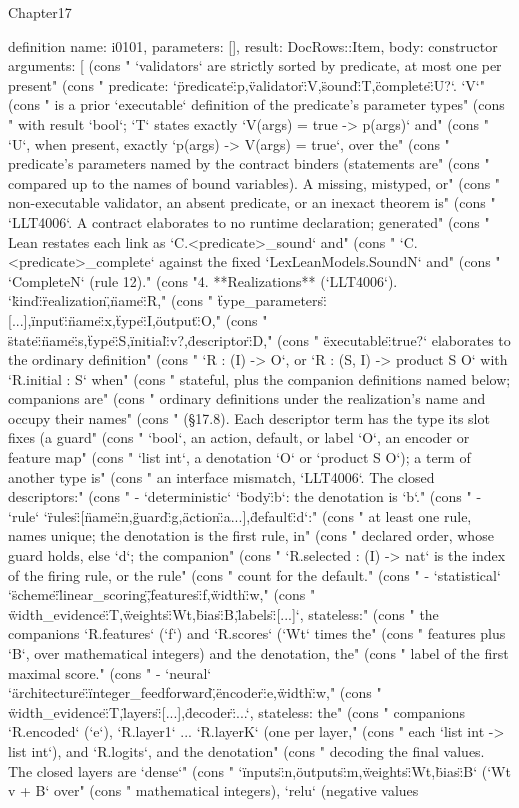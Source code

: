 \begin{lexlean}{Chapter17}
\begin{semanticmodule}
definition{
  name: i0101,
  parameters: [],
  result: DocRows::Item,
  body: constructor{
    arguments: [
      (cons "   `validators` are strictly sorted by predicate, at most one per present" (cons "   predicate: `{\"predicate\":p,\"validator\":V,\"sound\":T,\"complete\":U?}`. `V`" (cons "   is a prior `executable` definition of the predicate's parameter types" (cons "   with result `bool`; `T` states exactly `V(args) = true -> p(args)` and" (cons "   `U`, when present, exactly `p(args) -> V(args) = true`, over the" (cons "   predicate's parameters named by the contract binders (statements are" (cons "   compared up to the names of bound variables). A missing, mistyped, or" (cons "   non-executable validator, an absent predicate, or an inexact theorem is" (cons "   `LLT4006`. A contract elaborates to no runtime declaration; generated" (cons "   Lean restates each link as `C.<predicate>_sound` and" (cons "   `C.<predicate>_complete` against the fixed `LexLeanModels.SoundN` and" (cons "   `CompleteN` (rule 12)." (cons "4. **Realizations** (`LLT4006`). `{\"kind\":\"realization\",\"name\":R," (cons "   \"type_parameters\":[...],\"input\":{\"name\":x,\"type\":I},\"output\":O," (cons "   \"state\":{\"name\":s,\"type\":S,\"initial\":v}?,\"descriptor\":D," (cons "   \"executable\":true?}` elaborates to the ordinary definition" (cons "   `R : (I) -> O`, or `R : (S, I) -> product S O` with `R.initial : S` when" (cons "   stateful, plus the companion definitions named below; companions are" (cons "   ordinary definitions under the realization's name and occupy their names" (cons "   (§17.8). Each descriptor term has the type its slot fixes (a guard" (cons "   `bool`, an action, default, or label `O`, an encoder or feature map" (cons "   `list int`, a denotation `O` or `product S O`); a term of another type is" (cons "   an interface mismatch, `LLT4006`. The closed descriptors:" (cons "   - `deterministic` `{\"body\":b}`: the denotation is `b`." (cons "   - `rule` `{\"rules\":[{\"name\":n,\"guard\":g,\"action\":a}...],\"default\":d}`:" (cons "     at least one rule, names unique; the denotation is the first rule, in" (cons "     declared order, whose guard holds, else `d`; the companion" (cons "     `R.selected : (I) -> nat` is the index of the firing rule, or the rule" (cons "     count for the default." (cons "   - `statistical` `{\"scheme\":\"linear_scoring\",\"features\":f,\"width\":w," (cons "     \"width_evidence\":T,\"weights\":Wt,\"bias\":B,\"labels\":[...]}`, stateless:" (cons "     the companions `R.features` (`f`) and `R.scores` (`Wt` times the" (cons "     features plus `B`, over mathematical integers) and the denotation, the" (cons "     label of the first maximal score." (cons "   - `neural` `{\"architecture\":\"integer_feedforward\",\"encoder\":e,\"width\":w," (cons "     \"width_evidence\":T,\"layers\":[...],\"decoder\":...}`, stateless: the" (cons "     companions `R.encoded` (`e`), `R.layer1` ... `R.layerK` (one per layer," (cons "     each `list int -> list int`), and `R.logits`, and the denotation" (cons "     decoding the final values. The closed layers are `dense`" (cons "     `{\"inputs\":n,\"outputs\":m,\"weights\":Wt,\"bias\":B}` (`Wt v + B` over" (cons "     mathematical integers), `relu` (negative values }}
\end{semanticmodule}
\end{lexlean}
